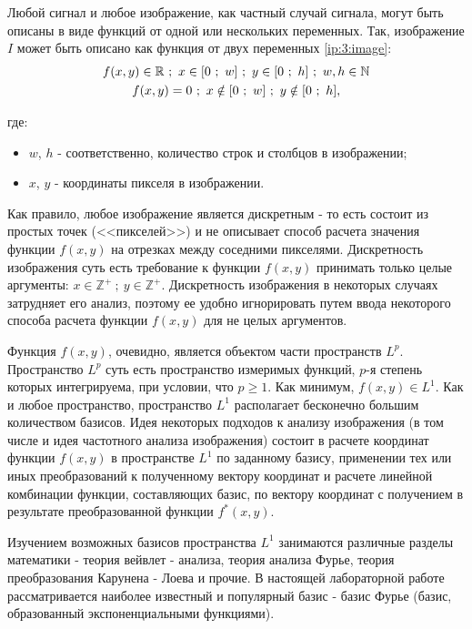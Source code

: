

Любой сигнал и любое изображение, как частный случай сигнала, могут быть описаны в виде функций от одной или нескольких переменных. Так, изображение $I$ может быть описано как функция от двух переменных \eqref{ip:3:image}:
\begin{gather}
	\label{ip:3:image} f(x, y) \in \mathbb{R} ~;~ x \in [0 ~;~ w] ~;~ y \in [0 ~;~ h] ~;~w, h \in \mathbb{N} \\
	\notag f(x, y) = 0 ~;~ x \notin [0 ~;~ w] ~;~ y \notin [0 ~;~ h],
\end{gather}

где:

\begin{itemize}

	\item $w$, $h$ - соответственно, количество строк и столбцов в изображении;
	\item $x$, $y$ - координаты пикселя в изображении.

\end{itemize}

Как правило, любое изображение является дискретным - то есть состоит из простых точек (<<пикселей>>) и не описывает способ расчета значения функции $f(x, y)$ на отрезках между соседними пикселями. Дискретность изображения суть есть требование к функции $f(x, y)$ принимать только целые аргументы: $x \in \mathbb{Z}^+ ~;~ y \in \mathbb{Z}^+$. Дискретность изображения в некоторых случаях затрудняет его анализ, поэтому ее удобно игнорировать путем ввода некоторого способа расчета функции $f(x, y)$ для не целых аргументов.

Функция $f(x, y)$, очевидно, является объектом части пространств $L^p$. Пространство $L^p$ суть есть пространство измеримых функций, $p$-я степень которых интегрируема, при условии, что $p \ge 1$. Как минимум, $f(x, y) \in L^1$. Как и любое пространство, пространство $L^1$ располагает бесконечно большим количеством базисов. Идея некоторых подходов к анализу изображения (в том числе и идея частотного анализа изображения) состоит в расчете координат функции $f(x, y)$ в пространстве $L^1$ по заданному базису, применении тех или иных преобразований к полученному вектору координат и расчете линейной комбинации функции, составляющих базис, по вектору координат с получением в результате преобразованной функции $f^*(x, y)$.

Изучением возможных базисов пространства $L^1$ занимаются различные разделы математики - теория вейвлет - анализа, теория анализа Фурье, теория преобразования Карунена - Лоева и прочие. В настоящей лабораторной работе рассматривается наиболее известный и популярный базис - базис Фурье (базис, образованный экспоненциальными функциями).

